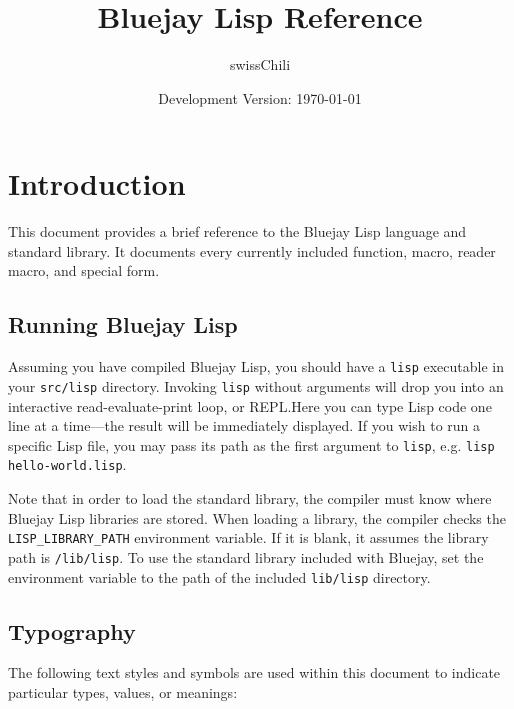 \documentclass[letterpaper,11pt,twocolumn]{article}
\title{Bluejay Lisp Reference}
\author{swissChili}
\date{Development Version: \today}
\begin{document}
\maketitle
\tableofcontents

\section{Introduction}

This document provides a brief reference to the Bluejay Lisp language
and standard library. It documents every currently included function,
macro, reader macro, and special form.

\subsection{Running Bluejay Lisp}

Assuming you have compiled Bluejay Lisp, you should have a
\texttt{lisp} executable in your \texttt{src/lisp} directory. Invoking
\texttt{lisp} without arguments will drop you into an interactive
read-evaluate-print loop, or REPL.\@ Here you can type Lisp code one
line at a time---the result will be immediately displayed. If you wish
to run a specific Lisp file, you may pass its path as the first
argument to \texttt{lisp}, e.g. \texttt{lisp hello-world.lisp}.

Note that in order to load the standard library, the compiler must
know where Bluejay Lisp libraries are stored. When loading a library,
the compiler checks the \texttt{LISP\_LIBRARY\_PATH} environment
variable. If it is blank, it assumes the library path is
\texttt{/lib/lisp}. To use the standard library included with Bluejay,
set the environment variable to the path of the included
\texttt{lib/lisp} directory.

\subsection{Typography}

The following text styles and symbols are used within this document to
indicate particular types, values, or meanings:
\end{document}
